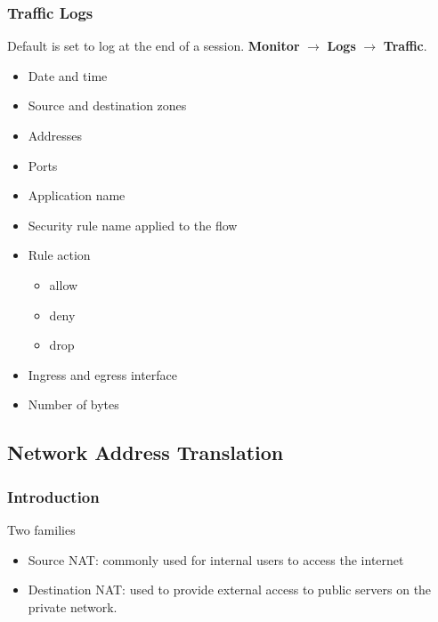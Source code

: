 \subsubsection{Traffic Logs}
Default is set to log at the end of a session. \textbf{Monitor} $\rightarrow$ \textbf{Logs} $\rightarrow$ \textbf{Traffic}.
    \begin{itemize}
        \item Date and time
        \item Source and destination zones
        \item Addresses
        \item Ports
        \item Application name
        \item Security rule name applied to the flow
        \item Rule action
            \begin{itemize}
                \item allow
                \item deny
                \item drop
            \end{itemize}
        \item Ingress and egress interface
        \item Number of bytes
    \end{itemize}    

\subsection{Network Address Translation}
\subsubsection{Introduction}
Two families
    \begin{itemize}
        \item Source NAT:  commonly used for internal users to access the internet
        \item Destination NAT: used to provide external access to public servers on the private network.
    \end{itemize}

